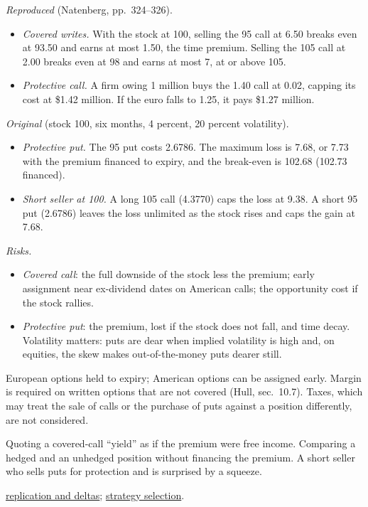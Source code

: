 \begin{qfmethod}
 \emph{Reproduced} (Natenberg, pp.~324--326).
\begin{itemize}
\item \emph{Covered writes.} With the stock at 100, selling the 95 call at 6.50 breaks even at 93.50 and earns at most 1.50, the time premium. Selling the 105 call at 2.00 breaks even at 98 and earns at most 7, at or above 105.
\item \emph{Protective call.} A firm owing \texteuro{}1 million buys the 1.40 call at 0.02, capping its cost at \$1.42 million. If the euro falls to 1.25, it pays \$1.27 million.
\end{itemize}

\emph{Original} (stock 100, six months, 4 percent, 20 percent volatility).
\begin{itemize}
\item \emph{Protective put.} The 95 put costs 2.6786. The maximum loss is 7.68, or 7.73 with the premium financed to expiry, and the break-even is 102.68 (102.73 financed).
\item \emph{Short seller at 100.} A long 105 call (4.3770) caps the loss at 9.38. A short 95 put (2.6786) leaves the loss unlimited as the stock rises and caps the gain at 7.68.
\end{itemize}

\emph{Risks.}
\begin{itemize}
\item \emph{Covered call}: the full downside of the stock less the premium; early assignment near ex-dividend dates on American calls; the opportunity cost if the stock rallies.
\item \emph{Protective put}: the premium, lost if the stock does not fall, and time decay. Volatility matters: puts are dear when implied volatility is high and, on equities, the skew makes out-of-the-money puts dearer still.
\end{itemize}

 European options held to expiry; American options can be assigned early. Margin is required on written options that are not covered (Hull, sec.~10.7). Taxes, which may treat the sale of calls or the purchase of puts against a position differently, are not considered.

 Quoting a covered-call ``yield'' as if the premium were free income. Comparing a hedged and an unhedged position without financing the premium. A short seller who sells puts for protection and is surprised by a squeeze.

 \hyperref[meth:option-replication-deltas]{replication and deltas}; \hyperref[ex:option-strategy-selection-case]{strategy selection}.

\end{qfmethod}

